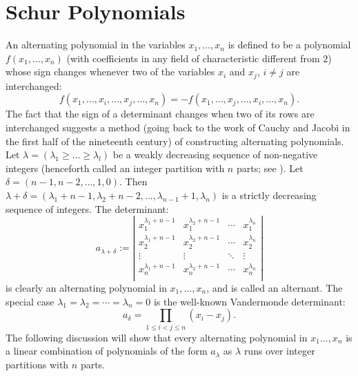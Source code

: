 \documentclass{amsart}
\theoremstyle{plain}
\begin{document}
\section{Schur Polynomials}
\label{sec:schur-polynomials}
An alternating polynomial in the variables $x_1,\dotsc,x_n$ is defined to be a polynomial $f(x_1,\dotsc,x_n)$ (with coefficients in any field of characteristic different from $2$) whose sign changes whenever two of the variables $x_i$ and $x_j$, $i\neq j$ are interchanged:
\begin{displaymath}
  f(x_1,\dotsc,x_i,\dotsc,x_j,\dotsc,x_n) = -f(x_1,\dotsc,x_j,\dotsc, x_i,\dotsc, x_n).
\end{displaymath}
The fact that the sign of a determinant changes when two of its rows are interchanged suggests a method (going back to the work of Cauchy and Jacobi in the first half of the nineteenth century) of constructing alternating polynomials.
Let $\lambda=(\lambda_1\geq \dotsc \geq\lambda_l)$ be a weakly decreasing sequence of non-negative integers (henceforth called an integer partition with $n$ parts; see \cite{andrews}).
Let $\delta=(n-1,n-2,\dotsc,1,0)$.
Then $\lambda+\delta=(\lambda_1+n-1,\lambda_2+n-2,\dotsc,\lambda_{n-1}+1,\lambda_n)$ is a strictly decreasing sequence of integers.
The determinant:
\begin{displaymath}
  a_{\lambda+\delta} := \left|
    \begin{matrix}
      x_1^{\lambda_1+n-1} & x_1^{\lambda_2+n-1} & \dotsb & x_1^{\lambda_n}\\
      x_2^{\lambda_1+n-1} & x_2^{\lambda_2+n-1} & \dotsb & x_2^{\lambda_n}\\
      \vdots & \vdots & \ddots & \vdots\\
      x_n^{\lambda_1+n-1} & x_n^{\lambda_2+n-1} & \dotsb & x_n^{\lambda_n}\\
    \end{matrix}
    \right|
\end{displaymath}
is clearly an alternating polynomial in $x_1,\dotsc,x_n$, and is called an alternant.
The special case $\lambda_1=\lambda_2=\dotsb=\lambda_n=0$ is the well-known Vandermonde determinant:
\begin{displaymath}
  a_\delta = \prod_{1\leq i<j\leq n}(x_i-x_j).
\end{displaymath}
The following discussion will show that every alternating polynomial in $x_1\dotsc,x_n$ is a linear combination of polynomials of the form $a_\lambda$ as $\lambda$ runs over integer partitions with $n$ parts.
\end{document}
